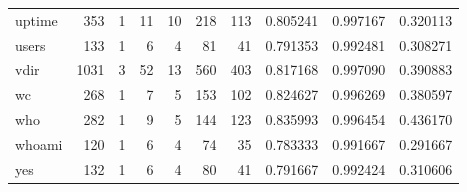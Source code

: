 \begin{longtable}{lrrrrrrrrr}
uptime    &                    353 &                                  1 &                                11 &                               10 &                               218 &                             113 &                                0.805241 &                               0.997167 &                             0.320113 \\
users     &                    133 &                                  1 &                                 6 &                                4 &                                81 &                              41 &                                0.791353 &                               0.992481 &                             0.308271 \\
vdir      &                   1031 &                                  3 &                                52 &                               13 &                               560 &                             403 &                                0.817168 &                               0.997090 &                             0.390883 \\
wc        &                    268 &                                  1 &                                 7 &                                5 &                               153 &                             102 &                                0.824627 &                               0.996269 &                             0.380597 \\
who       &                    282 &                                  1 &                                 9 &                                5 &                               144 &                             123 &                                0.835993 &                               0.996454 &                             0.436170 \\
whoami    &                    120 &                                  1 &                                 6 &                                4 &                                74 &                              35 &                                0.783333 &                               0.991667 &                             0.291667 \\
yes       &                    132 &                                  1 &                                 6 &                                4 &                                80 &                              41 &                                0.791667 &                               0.992424 &                             0.310606 \\
\end{longtable}
